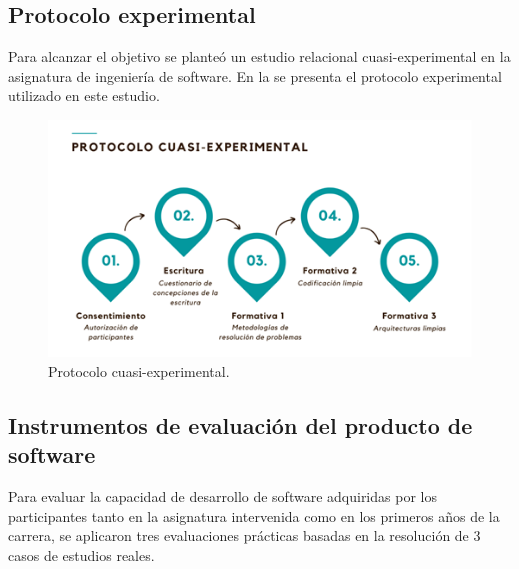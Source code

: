 \documentclass[spanish]{textolivre}
\begin{document}
\subsection{Protocolo experimental}

Para alcanzar el objetivo se planteó un estudio relacional cuasi-experimental en la asignatura de ingeniería de software. En la  se presenta el protocolo experimental utilizado en este estudio.

\begin{figure}[H]
\centering
\begin{minipage}{0.75\textwidth}
 \includegraphics[width=\textwidth]{figuras/Figura1.png}
 \caption{Protocolo cuasi-experimental.}
 \label{fig-metodo}
\end{minipage}
\end{figure}


\subsection{Instrumentos de evaluación del producto de software}

Para evaluar la capacidad de desarrollo de software adquiridas por los participantes tanto en la asignatura intervenida como en los primeros años de la carrera, se aplicaron tres evaluaciones prácticas basadas en la resolución de 3 casos de estudios reales. 
\end{document}

